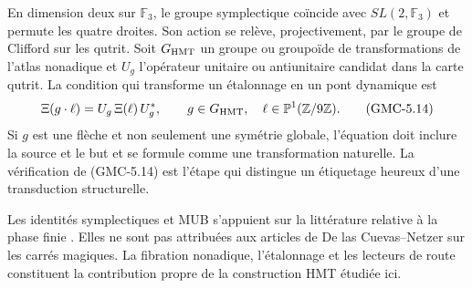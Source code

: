 En dimension deux sur $\mathbb F_3$, le groupe symplectique coïncide avec
$SL(2,\mathbb F_3)$ et permute les quatre droites. Son action se relève,
projectivement, par le groupe de Clifford sur les \PVM qutrit. Soit
$G_{\rm HMT}$ un groupe ou groupoïde de transformations de l’atlas nonadique et
$U_g$ l’opérateur unitaire ou antiunitaire candidat dans la carte qutrit. La
condition qui transforme un étalonnage en un pont dynamique est
\[
 \Xi(g\cdot\ell)=U_g\,\Xi(\ell)\,U_g^*,
 \qquad
 g\in G_{\rm HMT},\quad
 \ell\in\mathbb P^1(\mathbb Z/9\mathbb Z).
\tag{GMC-5.14}
\]
Si $g$ est une flèche et non seulement une symétrie globale, l'équation doit inclure
la source et le but et se formule comme une transformation naturelle. La vérification de
\textup{(GMC-5.14)} est l'étape qui distingue un étiquetage heureux d'une
transduction structurelle.

\begin{sourcebox}
Les identités symplectiques et MUB s'appuient sur la littérature relative à la phase finie
\citep{gibbons2004phase,planat2007rings}. Elles ne sont pas attribuées aux articles de
De las Cuevas--Netzer sur les carrés magiques. La fibration nonadique, l'étalonnage
et les lecteurs de route constituent la contribution propre de la
construction HMT étudiée ici.
\end{sourcebox}
